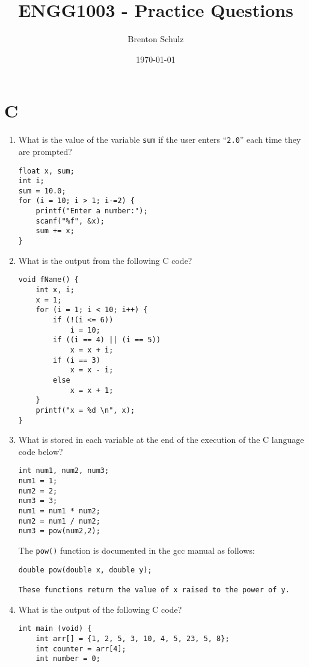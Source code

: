 \documentclass{lab}
\title{ENGG1003 - Practice Questions}
\author{Brenton Schulz}
\date{\today}
\begin{document}
\maketitle

\section{C}

\begin{enumerate}
\item What is the value of the variable \texttt{sum} if the user enters ``\texttt{2.0}'' each time they are prompted?
\begin{lstlisting}[style=CStyle]
float x, sum;
int i;
sum = 10.0;
for (i = 10; i > 1; i-=2) {
	printf("Enter a number:");
	scanf("%f", &x);
	sum += x;
}
\end{lstlisting}

\item What is the output from the following C code?

\begin{lstlisting}[style=CStyle]
void fName() {
	int x, i;
	x = 1;
	for (i = 1; i < 10; i++) {
		if (!(i <= 6))
			i = 10;
		if ((i == 4) || (i == 5))
			x = x + i;
		if (i == 3)
			x = x - i;
		else
			x = x + 1;
	}
	printf("x = %d \n", x);
}
\end{lstlisting}

\item What is stored in each variable at
the end of the execution of the C language code below?

\begin{lstlisting}[style=CStyle]
int num1, num2, num3;
num1 = 1;
num2 = 2;
num3 = 3;
num1 = num1 * num2;
num2 = num1 / num2;
num3 = pow(num2,2);
\end{lstlisting}

The \texttt{pow()} function is documented in the gcc manual as follows:

\begin{lstlisting}[style=pseudo]
double pow(double x, double y);

These functions return the value of x raised to the power of y.
\end{lstlisting}

\pagebreak
\item What is the output of the following C code?

\begin{lstlisting}[style=CStyle]
int main (void) {
	int arr[] = {1, 2, 5, 3, 10, 4, 5, 23, 5, 8};
	int counter = arr[4];
	int number = 0;
	

\end{lstlisting}
\end{enumerate}
\end{document}
